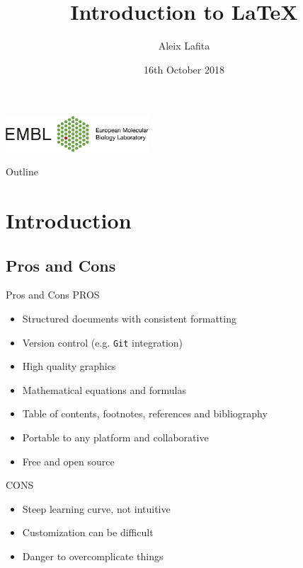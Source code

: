 \documentclass[inputenc]{beamer}
\title[Introduction to LaTeX]{\huge Introduction to \LaTeX{}}
\author{Aleix Lafita}
\institute{Bateman group (EMBL-EBI)}
\date{16th October 2018}
\begin{document}
\begin{frame}
  \titlepage
  \centering
  \includegraphics[width=0.4\textwidth]{embl_logo}
\end{frame}

\begin{frame}{Outline}
    \tableofcontents
\end{frame}

\section{Introduction}

\subsection{Pros and Cons}

\begin{frame}{Pros and Cons}
    PROS
    \begin{itemize}
        \item Structured documents with consistent formatting
        \item Version control (e.g. \texttt{Git} integration)
        \item High quality graphics
        \item Mathematical equations and formulas
        \item Table of contents, footnotes, references and bibliography
        \item Portable to any platform and collaborative
        \item Free and open source
    \end{itemize}
    \vspace{0.5cm}
    CONS
    \begin{itemize}
        \item Steep learning curve, not intuitive
        \item Customization can be difficult
        \item Danger to overcomplicate things
    \end{itemize}
\end{frame}
\end{document}
